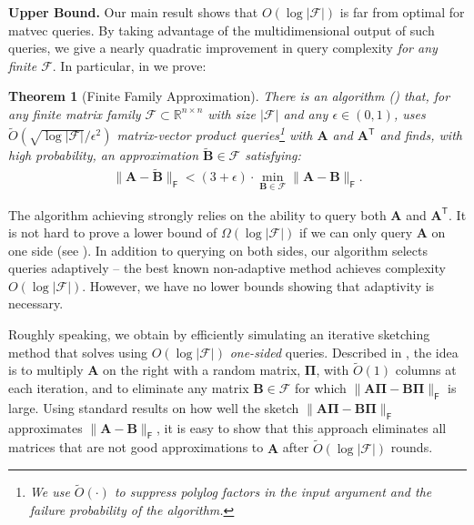 \documentclass{article}[11pt]
\newtheorem{theorem}{Theorem}
\theoremstyle{definition}
\newcommand{\bv}[1]{\boldsymbol{\mathbf{#1}}}
\newcommand{\R}{\mathbb{R}}
\newcommand{\Fro}{\mathsf{F}}
\newcommand{\F}{\mathcal{F}}
\newcommand{\transpose}{\mathsf{T}}
\newcommand{\family}{\mathcal{F}}
\newcommand{\logfamily}{\log |\mathcal{F}|}
\begin{document}
\smallskip\noindent \textbf{Upper Bound.} Our main result shows that $O(\log|\mathcal{F}|)$ is far from optimal for matvec queries. By taking advantage of the multidimensional output of such queries, we give a nearly quadratic improvement in query complexity  \emph{for any finite $\mathcal{F}$}. In particular, in  we prove:
\begin{theorem}[Finite Family Approximation]\label{thm:robust}
    There is an algorithm () that, for any finite matrix family $\mathcal{F}\subset \R^{n\times n}$ with size $|\mathcal{F}|$ and any $\epsilon \in (0,1)$, uses $\tilde{O}(\sqrt{\logfamily}/\epsilon^2)$ matrix-vector product queries\footnote{We use $\tilde{O}(\cdot)$ to suppress polylog factors in the input argument and the failure probability of the algorithm.} 
    with $\bv{A}$ and $\bv{A}^\transpose$ and finds, with high probability, an approximation $\bv{\tilde B} \in \family$ satisfying:
    \begin{align*}
        \|\bv{A} - \bv{\tilde B} \|_{\Fro} < (3+\epsilon)\cdot \min_{\bv{B} \in \family} \|\bv{A}- \bv{B}\|_{\Fro}.
    \end{align*}
\end{theorem}
The algorithm achieving  strongly relies on the ability to query both $\bv{A}$ and $\bv{A}^\transpose$. It is not hard to prove a lower bound of $\Omega(\log|\mathcal{\F}|)$ if we can only query $\bv{A}$ on one side (see ). In addition to querying on both sides, our algorithm selects queries adaptively -- the best known non-adaptive method achieves complexity $O(\log |\F|)$. However, we have no lower bounds showing that adaptivity is necessary.

Roughly speaking, we obtain  by efficiently simulating an iterative sketching method that solves  using ${O}(\log |\F|)$ \emph{one-sided} queries. Described in , the idea is to multiply $\bv{A}$ on the right with a random matrix, $\bv{\Pi}$, with $\tilde{O}(1)$ columns at each iteration, and to eliminate any matrix $\bv{B} \in \mathcal{F}$ for which $\|\bv{A}\bv{\Pi}-\bv{B}\bv{\Pi}\|_{\Fro}$ is large. Using standard results on how well the sketch $\|\bv{A}\bv{\Pi}-\bv{B}\bv{\Pi}\|_\Fro$ approximates $\|\bv{A}-\bv{B}\|_\Fro$, it is easy to show that this approach eliminates all matrices that are not good approximations to $\bv{A}$ after $\tilde{O}(\log |\mathcal{F}|)$ rounds. 
\end{document}
